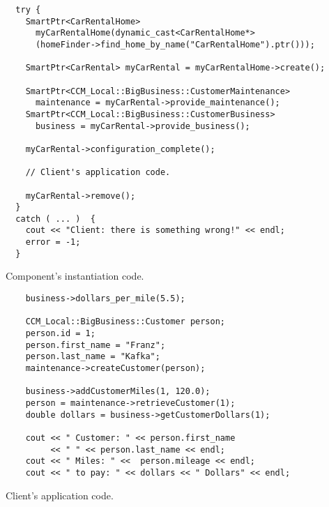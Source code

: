 \begin{Example}
\begin{minifbox}
\begin{small}
\begin{verbatim}
  try {
    SmartPtr<CarRentalHome> 
      myCarRentalHome(dynamic_cast<CarRentalHome*>
      (homeFinder->find_home_by_name("CarRentalHome").ptr()));

    SmartPtr<CarRental> myCarRental = myCarRentalHome->create();

    SmartPtr<CCM_Local::BigBusiness::CustomerMaintenance> 
      maintenance = myCarRental->provide_maintenance();    
    SmartPtr<CCM_Local::BigBusiness::CustomerBusiness> 
      business = myCarRental->provide_business();

    myCarRental->configuration_complete();

    // Client's application code.

    myCarRental->remove();
  } 
  catch ( ... )  {
    cout << "Client: there is something wrong!" << endl;
    error = -1;
  }
\end{verbatim}
\end{small}
\end{minifbox}
\caption{Component's instantiation code.}
\label{example:ClientComponentInstance}
\end{Example}



\begin{Example}
\begin{minifbox}
\begin{small}
\begin{verbatim}
    business->dollars_per_mile(5.5);
    
    CCM_Local::BigBusiness::Customer person;
    person.id = 1;
    person.first_name = "Franz";
    person.last_name = "Kafka";
    maintenance->createCustomer(person);

    business->addCustomerMiles(1, 120.0); 
    person = maintenance->retrieveCustomer(1);
    double dollars = business->getCustomerDollars(1); 

    cout << " Customer: " << person.first_name 
         << " " << person.last_name << endl;
    cout << " Miles: " <<  person.mileage << endl;
    cout << " to pay: " << dollars << " Dollars" << endl;
\end{verbatim}
\end{small}
\end{minifbox}
\caption{Client's application code.}
\label{example:ClientApplication}
\end{Example}

